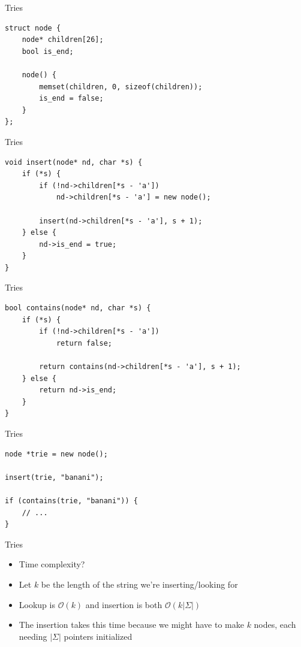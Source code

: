 \documentclass{beamer}
\begin{document}
\begin{frame}{Tries}
    \begin{verbatim}
struct node {
    node* children[26];
    bool is_end;

    node() {
        memset(children, 0, sizeof(children));
        is_end = false;
    }
};
    \end{verbatim}
\end{frame}

\begin{frame}{Tries}
    \begin{verbatim}
void insert(node* nd, char *s) {
    if (*s) {
        if (!nd->children[*s - 'a'])
            nd->children[*s - 'a'] = new node();

        insert(nd->children[*s - 'a'], s + 1);
    } else {
        nd->is_end = true;
    }
}
    \end{verbatim}
\end{frame}

\begin{frame}{Tries}
    \begin{verbatim}
bool contains(node* nd, char *s) {
    if (*s) {
        if (!nd->children[*s - 'a'])
            return false;

        return contains(nd->children[*s - 'a'], s + 1);
    } else {
        return nd->is_end;
    }
}
    \end{verbatim}
\end{frame}

\begin{frame}{Tries}
    \begin{verbatim}
node *trie = new node();

insert(trie, "banani");

if (contains(trie, "banani")) {
    // ...
}
    \end{verbatim}
\end{frame}

\begin{frame}[plain]{Tries}
    \begin{itemize}
        \item Time complexity?
        \vspace{10pt}
        \item Let $k$ be the length of the string we're inserting/looking for
        \item Lookup is $\mathcal{O}(k)$ and insertion is both $\mathcal{O}(k|\Sigma|)$
        \item The insertion takes this time because we might have to make $k$ nodes, each needing $|\Sigma|$ pointers initialized
    \end{itemize}
\end{frame}
\end{document}
